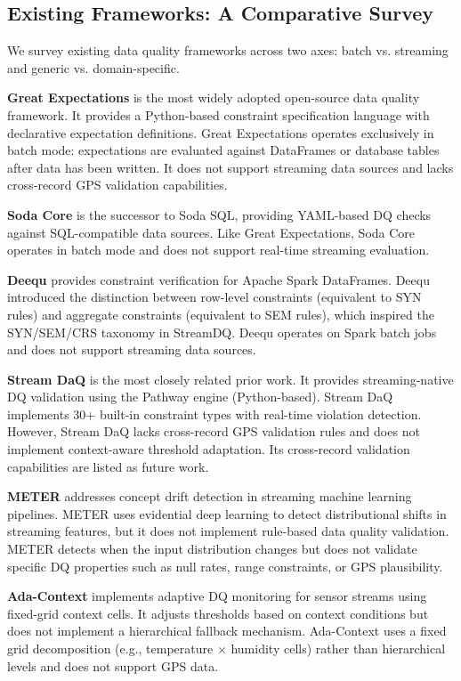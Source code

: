 \subsection{Existing Frameworks: A Comparative Survey}
\label{sec:dq-survey}

We survey existing data quality frameworks across two axes: batch vs. streaming
and generic vs. domain-specific.

\textbf{Great Expectations} \citep{great_expectations} is the most widely
adopted open-source data quality framework. It provides a Python-based
constraint specification language with declarative expectation definitions.
Great Expectations operates exclusively in batch mode: expectations are
evaluated against DataFrames or database tables after data has been written.
It does not support streaming data sources and lacks cross-record GPS
validation capabilities.

\textbf{Soda Core} \citep{soda-core} is the successor to Soda SQL,
providing YAML-based DQ checks against SQL-compatible data sources.
Like Great Expectations, Soda Core operates in batch mode and does not
support real-time streaming evaluation.

\textbf{Deequ} \citep{deequ2018} provides constraint verification for
Apache Spark DataFrames. Deequ introduced the distinction between
row-level constraints (equivalent to SYN rules) and aggregate constraints
(equivalent to SEM rules), which inspired the SYN/SEM/CRS taxonomy in
StreamDQ. Deequ operates on Spark batch jobs and does not support
streaming data sources.

\textbf{Stream DaQ} \citep{streamdaq2025} is the most closely related
prior work. It provides streaming-native DQ validation using the Pathway
engine (Python-based). Stream DaQ implements 30+ built-in constraint types
with real-time violation detection. However, Stream DaQ lacks cross-record
GPS validation rules and does not implement context-aware threshold adaptation.
Its cross-record validation capabilities are listed as future work.

\textbf{METER} \citep{meter2024} addresses concept drift detection in
streaming machine learning pipelines. METER uses evidential deep learning
to detect distributional shifts in streaming features, but it does not
implement rule-based data quality validation. METER detects when the input
distribution changes but does not validate specific DQ properties such as
null rates, range constraints, or GPS plausibility.

\textbf{Ada-Context} \citep{adacontext2025} implements adaptive DQ
monitoring for sensor streams using fixed-grid context cells. It adjusts
thresholds based on context conditions but does not implement a hierarchical
fallback mechanism. Ada-Context uses a fixed grid decomposition (e.g.,
temperature $\times$ humidity cells) rather than hierarchical levels and
does not support GPS data.


